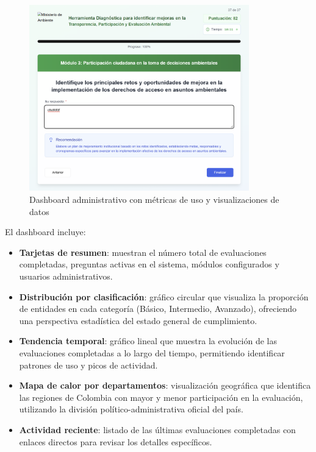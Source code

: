 \documentclass[12pt,a4paper]{report}
\begin{document}
\begin{figure}[h]
    \centering
    \includegraphics[width=0.85\textwidth]{Captura de pantalla 2025-06-26 122710.png}
    \caption{Dashboard administrativo con métricas de uso y visualizaciones de datos}
\end{figure}

El dashboard incluye:
\begin{itemize}[leftmargin=*]
    \item \textbf{Tarjetas de resumen}: muestran el número total de evaluaciones completadas, preguntas activas en el sistema, módulos configurados y usuarios administrativos.
    \item \textbf{Distribución por clasificación}: gráfico circular que visualiza la proporción de entidades en cada categoría (Básico, Intermedio, Avanzado), ofreciendo una perspectiva estadística del estado general de cumplimiento.
    \item \textbf{Tendencia temporal}: gráfico lineal que muestra la evolución de las evaluaciones completadas a lo largo del tiempo, permitiendo identificar patrones de uso y picos de actividad.
    \item \textbf{Mapa de calor por departamentos}: visualización geográfica que identifica las regiones de Colombia con mayor y menor participación en la evaluación, utilizando la división político-administrativa oficial del país.
    \item \textbf{Actividad reciente}: listado de las últimas evaluaciones completadas con enlaces directos para revisar los detalles específicos.
\end{itemize}
\end{document}
